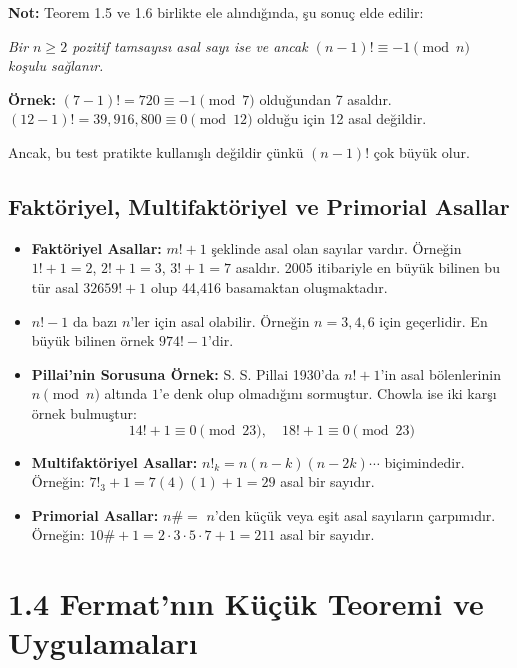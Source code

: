 \textbf{Not:} Teorem 1.5 ve 1.6 birlikte ele alındığında, şu sonuç elde edilir:

\begin{center}
\textit{Bir $n \geq 2$ pozitif tamsayısı asal sayı ise ve ancak $(n - 1)! \equiv -1 \pmod{n}$ koşulu sağlanır.}
\end{center}

\textbf{Örnek:}  
$(7 - 1)! = 720 \equiv -1 \pmod{7}$ olduğundan 7 asaldır.  
$(12 - 1)! = 39,916,800 \equiv 0 \pmod{12}$ olduğu için 12 asal değildir.

Ancak, bu test pratikte kullanışlı değildir çünkü $(n - 1)!$ çok büyük olur.

\subsection*{Faktöriyel, Multifaktöriyel ve Primorial Asallar}

\begin{itemize}[leftmargin=1.5em, noitemsep, topsep=0pt]
    \item \textbf{Faktöriyel Asallar:}  
    $m! + 1$ şeklinde asal olan sayılar vardır. Örneğin $1! + 1 = 2$, $2! + 1 = 3$, $3! + 1 = 7$ asaldır.  
    2005 itibariyle en büyük bilinen bu tür asal $32659! + 1$ olup 44,416 basamaktan oluşmaktadır.

    \item $n! - 1$ da bazı $n$'ler için asal olabilir. Örneğin $n = 3, 4, 6$ için geçerlidir. En büyük bilinen örnek $974! - 1$'dir.

    \item \textbf{Pillai'nin Sorusuna Örnek:}  
    S. S. Pillai 1930'da $n! + 1$'in asal bölenlerinin $n \pmod{n}$ altında $1$'e denk olup olmadığını sormuştur. Chowla ise iki karşı örnek bulmuştur:
    \[
    14! + 1 \equiv 0 \pmod{23}, \quad 18! + 1 \equiv 0 \pmod{23}
    \]

    \item \textbf{Multifaktöriyel Asallar:}  
    $n!_k = n(n-k)(n-2k)\cdots$ biçimindedir.  
    Örneğin: $7!_3 + 1 = 7(4)(1) + 1 = 29$ asal bir sayıdır.

    \item \textbf{Primorial Asallar:}  
    $n\# = $ $n$'den küçük veya eşit asal sayıların çarpımıdır.  
    Örneğin: $10\# + 1 = 2 \cdot 3 \cdot 5 \cdot 7 + 1 = 211$ asal bir sayıdır.
\end{itemize}

\section*{1.4 Fermat'nın Küçük Teoremi ve Uygulamaları}

